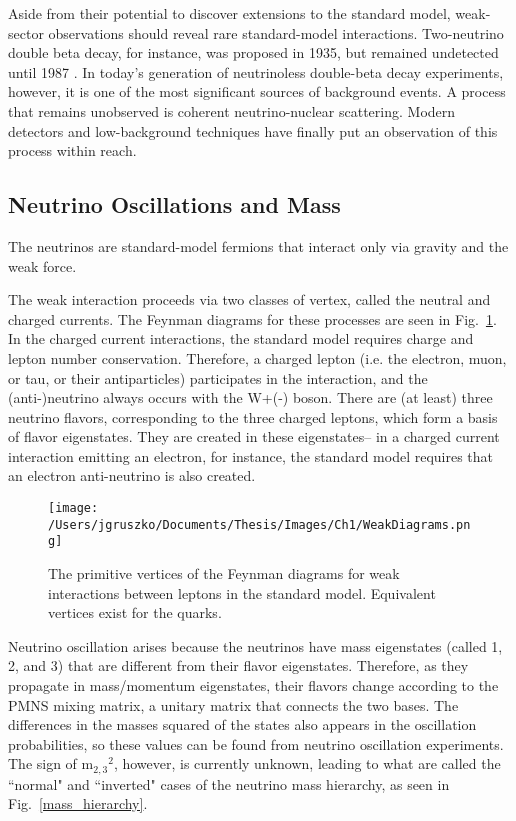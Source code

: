 Aside from their potential to discover extensions to the standard model, weak-sector observations should reveal rare standard-model interactions. Two-neutrino double beta decay, for instance, was proposed in 1935, but remained undetected until 1987 \cite{Moe1987}. In today's generation of neutrinoless double-beta decay experiments, however, it is one of the most significant sources of background events. A process that remains unobserved is coherent neutrino-nuclear scattering. Modern detectors and low-background techniques have finally put an observation of this process within reach. 

\subsection{Neutrino Oscillations and Mass}
The neutrinos are standard-model fermions that interact only via gravity and the weak force. 

The weak interaction proceeds via two classes of vertex, called the neutral and charged currents. The Feynman diagrams for these processes are seen in Fig.~\ref{weak_diagrams}. In the charged current interactions, the standard model requires charge and lepton number conservation. Therefore, a charged lepton (i.e. the electron, muon, or tau, or their antiparticles) participates in the interaction, and the (anti-)neutrino always occurs with the W+(-) boson. There are (at least) three neutrino flavors, corresponding to the three charged leptons, which form a basis of flavor eigenstates. They are created in these eigenstates-- in a charged current interaction emitting an electron, for instance, the standard model requires that an electron anti-neutrino is also created. 

\begin{figure}[h]
\hfil \texttt{[image: /Users/jgruszko/Documents/Thesis/Images/Ch1/WeakDiagrams.png]} \hfil
\caption{The primitive vertices of the Feynman diagrams for weak interactions between leptons in the standard model. Equivalent vertices exist for the quarks. \cite{PDG2014}}
\label{weak_diagrams}
\end{figure}

Neutrino oscillation arises because the neutrinos have mass eigenstates (called 1, 2, and 3) that are different from their flavor eigenstates. Therefore, as they propagate in mass/momentum eigenstates, their flavors change according to the PMNS mixing matrix, a unitary matrix that connects the two bases.  The differences in the masses squared of the states also appears in the oscillation probabilities, so these values can be found from neutrino oscillation experiments. The sign of m$_{2,3}$$^{2}$, however, is currently unknown, leading to what are called the ``normal" and ``inverted" cases of the neutrino mass hierarchy, as seen in Fig.~\ref{mass_hierarchy}. 

